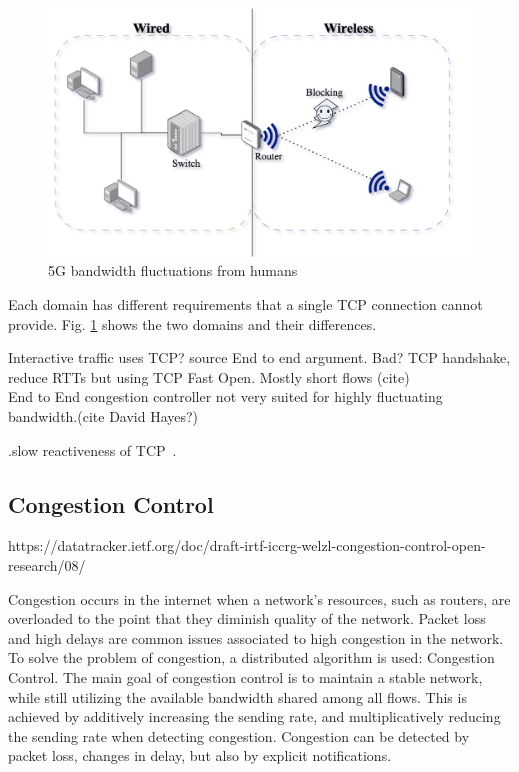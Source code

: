 \documentclass[a4paper,english, 11pt]{report}
\begin{document}
\begin{figure}[h] %
	\centering
	\includegraphics[scale=0.65]{../diagrams/drawio/domains.png}
  	\caption{5G bandwidth fluctuations from humans}
  	\label{fig:domains}
\end{figure}

Each domain has different requirements that a single TCP connection cannot provide. Fig. \ref{fig:domains} shows the two domains and their differences.

Interactive traffic uses TCP? {source}
End to end argument. Bad?
TCP handshake, reduce RTTs but using TCP Fast Open. Mostly short flows (cite)
\\
End to End congestion controller not very suited for highly fluctuating bandwidth.(cite David Hayes?)

.slow reactiveness of TCP~\cite{tcp_mmwave_proxy}.

\subsection{Congestion Control}
https://datatracker.ietf.org/doc/draft-irtf-iccrg-welzl-congestion-control-open-research/08/

Congestion occurs in the internet when a network's resources, such as routers, are overloaded to the point that they diminish quality of the network. Packet loss and high delays are common issues associated to high congestion in the network. To solve the problem of congestion, a distributed algorithm is used: Congestion Control. The main goal of congestion control is to maintain a stable network, while still utilizing the available bandwidth shared among all flows. This is achieved by additively increasing the sending rate, and multiplicatively reducing the sending rate when detecting congestion. Congestion can be detected by packet loss, changes in delay, but also by explicit notifications.\\
\end{document}
